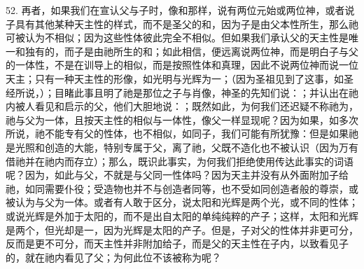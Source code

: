 52. 再者，如果我们在宣认父与子时，像和那样，说有两位元始或两位神，或者说子具有其他某种天主性的样式，而不是圣父的和，因为子是由父本性所生，那么祂可被认为不相似；因为这些性体彼此完全不相似。但如果我们承认父的天主性是唯一和独有的，而子是由祂所生的和；如此相信，便远离说两位神，而是明白子与父的一体性，不是在训导上的相似，而是按照性体和真理，因此不说两位神而说一位天主；只有一种天主性的形像，如光明与光辉为一；（因为圣祖见到了这事，如圣经所说，）；目睹此事且明了祂是那位之子与肖像，神圣的先知们说：；并认出在祂内被人看见和启示的父，他们大胆地说：；既然如此，为何我们还迟疑不称祂为，祂与父为一体，且按天主性的相似与一体性，像父一样显现呢？因为如果，如多次所说，祂不能专有父的性体，也不相似，如同子，我们可能有所犹豫：但是如果祂是光照和创造的大能，特别专属于父，离了祂，父既不造化也不被认识（因为万有借祂并在祂内而存立）；那么，既识此事实，为何我们拒绝使用传达此事实的词语呢？因为，如此与父，不就是与父同一性体吗？因为天主并没有从外面附加子给祂，如同需要仆役；受造物也并不与创造者同等，也不受如同创造者般的尊崇，或被认为与父为一体。或者有人敢于区分，说太阳和光辉是两个光，或不同的性体；或说光辉是外加于太阳的，而不是出自太阳的单纯纯粹的产子；这样，太阳和光辉是两个，但光却是一，因为光辉是太阳的产子。但是，子对父的性体并非更可分，反而是更不可分，而天主性并非附加给子，而是父的天主性在子内，以致看见子的，就在祂内看见了父；为何此位不该被称为呢？\par

